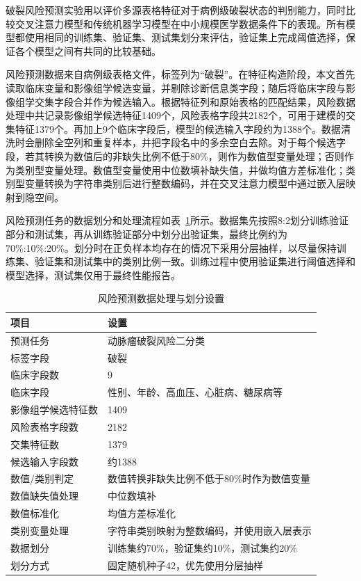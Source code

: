 破裂风险预测实验用以评价多源表格特征对于病例级破裂状态的判别能力，同时比较交叉注意力模型和传统机器学习模型在中小规模医学数据条件下的表现。所有模型都使用相同的训练集、验证集、测试集划分来评估，验证集上完成阈值选择，保证各个模型之间有共同的比较基础。

风险预测数据来自病例级表格文件，标签列为“破裂”。在特征构造阶段，本文首先读取临床变量和影像组学候选变量，并剔除诊断信息类字段；随后将临床字段与影像组学交集字段合并作为候选输入。根据特征列和原始表格的匹配结果，风险数据处理中共记录影像组学候选特征1409个，风险表格字段共2182个，可用于建模的交集特征1379个。再加上9个临床字段后，模型的候选输入字段约为1388个。数据清洗时会删除全空列和重复样本，并把字段名中的多余空白去除。对于每个候选字段，若其转换为数值后的非缺失比例不低于80\%，则作为数值型变量处理；否则作为类别型变量处理。数值型变量使用中位数填补缺失值，并做均值方差标准化；类别型变量转换为字符串类别后进行整数编码，并在交叉注意力模型中通过嵌入层映射到隐空间。

风险预测任务的数据划分和处理流程如表~\ref{tab:risk_data_process}所示。数据集先按照8:2划分训练验证部分和测试集，再从训练验证部分中划分出验证集，最终比例约为70\%:10\%:20\%。划分时在正负样本均存在的情况下采用分层抽样，以尽量保持训练集、验证集和测试集中的类别比例一致。训练过程中使用验证集进行阈值选择和模型选择，测试集仅用于最终性能报告。

\begin{table}[!htbp]
\centering
\caption{风险预测数据处理与划分设置}
\label{tab:risk_data_process}
\small
\renewcommand{\arraystretch}{0.88}
\setlength{\tabcolsep}{4pt}
\begin{tabular}{ll}
\toprule
项目 & 设置 \\
\midrule
预测任务 & 动脉瘤破裂风险二分类 \\
标签字段 & 破裂 \\
临床字段数 & 9 \\
临床字段 & 性别、年龄、高血压、心脏病、糖尿病等 \\
影像组学候选特征数 & 1409 \\
风险表格字段数 & 2182 \\
交集特征数 & 1379 \\
候选输入字段数 & 约1388 \\
数值/类别判定 & 数值转换非缺失比例不低于80\%时作为数值变量 \\
数值缺失值处理 & 中位数填补 \\
数值标准化 & 均值方差标准化 \\
类别变量处理 & 字符串类别映射为整数编码，并使用嵌入层表示 \\
数据划分 & 训练集约70\%，验证集约10\%，测试集约20\% \\
划分方式 & 固定随机种子42，优先使用分层抽样 \\
\bottomrule
\end{tabular}
\normalsize
\renewcommand{\arraystretch}{1}
\end{table}

